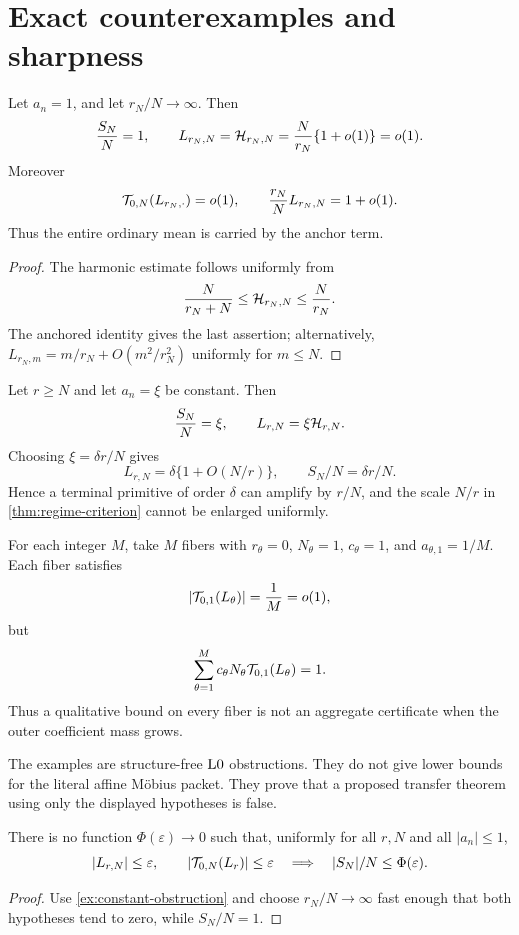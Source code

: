 \section{Exact counterexamples and sharpness}
\label{sec:counterexamples}

\begin{example}
\label{ex:constant-obstruction}
Let \(a_n=1\), and let \(r_N/N\to\infty\).  Then
\[
 \frac{S_N}{N}=1,
\qquad
 L_{r_N,N}=\mathcal H_{r_N,N}
 =\frac{N}{r_N}\{1+o(1)\}=o(1).
\]
Moreover
\[
 \mathcal T_{0,N}(L_{r_N,\cdot})=o(1),
\qquad
 \frac{r_N}{N}L_{r_N,N}=1+o(1).
\]
Thus the entire ordinary mean is carried by the anchor term.
\end{example}

\begin{proof}
The harmonic estimate follows uniformly from
\[
 \frac{N}{r_N+N}\le\mathcal H_{r_N,N}\le\frac{N}{r_N}.
\]
The anchored identity gives the last assertion; alternatively,
\(L_{r_N,m}=m/r_N+O(m^2/r_N^2)\) uniformly for \(m\le N\).
\end{proof}

\begin{example}
\label{ex:tuned-anchor}
Let \(r\ge N\) and let \(a_n=\xi\) be constant.  Then
\[
 \frac{S_N}{N}=\xi,\qquad
 L_{r,N}=\xi\mathcal H_{r,N}.
\]
Choosing \(\xi=\delta r/N\) gives
\[
 L_{r,N}=\delta\{1+O(N/r)\},
\qquad
 S_N/N=\delta r/N.
\]
Hence a terminal primitive of order \(\delta\) can amplify by
\(r/N\), and the scale \(N/r\) in
\cref{thm:regime-criterion} cannot be enlarged uniformly.
\end{example}

\begin{example}
\label{ex:outer-mass}
For each integer \(M\), take \(M\) fibers with \(r_\theta=0\),
\(N_\theta=1\), \(c_\theta=1\), and
\(a_{\theta,1}=1/M\).  Each fiber satisfies
\[
 |\mathcal T_{0,1}(L_\theta)|=\frac1M=o(1),
\]
but
\[
 \sum_{\theta=1}^M
 c_\theta N_\theta\mathcal T_{0,1}(L_\theta)=1.
\]
Thus a qualitative bound on every fiber is not an aggregate
certificate when the outer coefficient mass grows.
\end{example}

\begin{remark}
The examples are structure-free \(\mathrm{L0}\) obstructions.  They do not
give lower bounds for the literal affine M\"obius packet.  They prove
that a proposed transfer theorem using only the displayed hypotheses
is false.
\end{remark}

\begin{proposition}
\label{prop:no-anchor-free}
There is no function \(\Phi(\varepsilon)\to0\) such that, uniformly
for all \(r,N\) and all \(|a_n|\le1\),
\[
 |L_{r,N}|\le\varepsilon,\qquad
 |\mathcal T_{0,N}(L_r)|\le\varepsilon
 \quad\Longrightarrow\quad
 |S_N|/N\le\Phi(\varepsilon).
\]
\end{proposition}

\begin{proof}
Use \cref{ex:constant-obstruction} and choose \(r_N/N\to\infty\)
fast enough that both hypotheses tend to zero, while
\(S_N/N=1\).
\end{proof}
